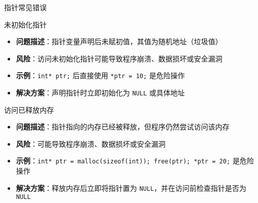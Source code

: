 \documentclass[UTF8,aspectratio=169]{beamer}
\begin{document}
\begin{frame}{指针常见错误}
    \begin{ytublock}{未初始化指针}
        \begin{itemize}
            \item \textbf{问题描述}：指针变量声明后未赋初值，其值为随机地址（垃圾值）
            \item \textbf{风险}：访问未初始化指针可能导致程序崩溃、数据损坏或安全漏洞
            \item \textbf{示例}：\texttt{int* ptr;} 后直接使用 \texttt{*ptr = 10;} 是危险操作
            \item \textbf{解决方案}：声明指针时立即初始化为 \texttt{NULL} 或具体地址
        \end{itemize}
    \end{ytublock}
    \begin{ytublock}{访问已释放内存}
        \begin{itemize}
            \item \textbf{问题描述}：指针指向的内存已经被释放，但程序仍然尝试访问该内存
            \item \textbf{风险}：可能导致程序崩溃、数据损坏或安全漏洞
            \item \textbf{示例}：\texttt{int* ptr = malloc(sizeof(int)); free(ptr); *ptr = 20;} 是危险操作
            \item \textbf{解决方案}：释放内存后立即将指针置为 \texttt{NULL}，并在访问前检查指针是否为 \texttt{NULL}
        \end{itemize}
    \end{ytublock}
\end{frame}
\end{document}
